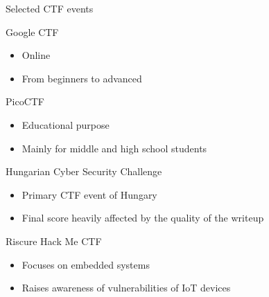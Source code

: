 \documentclass[12 pt]{beamer}
\begin{document}

\begin{frame}{Selected CTF events}

  \begin{block}{Google CTF}
    \begin{itemize}
      \item{Online}
      \item{From beginners to advanced}
    \end{itemize}
  \end{block}

  \begin{block}{PicoCTF}
    \begin{itemize}
      \item{Educational purpose}
      \item{Mainly for middle and high school students}
    \end{itemize}
  \end{block}

  \begin{block}{Hungarian Cyber Security Challenge}
    \begin{itemize}
      \item{Primary CTF event of Hungary}
      \item{Final score heavily affected by the quality of the writeup}
    \end{itemize}
  \end{block}

  \begin{block}{Riscure Hack Me CTF}
    \begin{itemize}
      \item{Focuses on embedded systems}
      \item{Raises awareness of vulnerabilities of IoT devices}
    \end{itemize}
  \end{block}

\end{frame}

\end{document}
